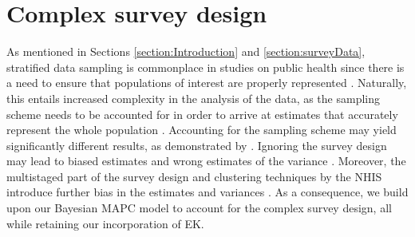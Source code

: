 \section{Complex survey design}
\label{section:application2}
As mentioned in Sections \ref{section:Introduction} and \ref{section:surveyData}, stratified data sampling is commonplace in studies on public health since there is a need to ensure that populations of interest are properly represented \citep{lehtonen2004practical}. Naturally, this entails increased complexity in the analysis of the data, as the sampling scheme needs to be accounted for in order to arrive at estimates that accurately represent the whole population \citep{skinner2017introduction}. Accounting for the sampling scheme may yield significantly different results, as demonstrated by \cite{SurveyDesignMercer}. Ignoring the survey design may lead to biased estimates and wrong estimates of the variance \citep{kaombe2023impact}. Moreover, the multistaged part of the survey design and clustering techniques by the NHIS introduce further bias in the estimates and variances \citep{roberts2000pitfalls}. As a consequence, we build upon our Bayesian MAPC model to account for the complex survey design, all while retaining our incorporation of EK. 

